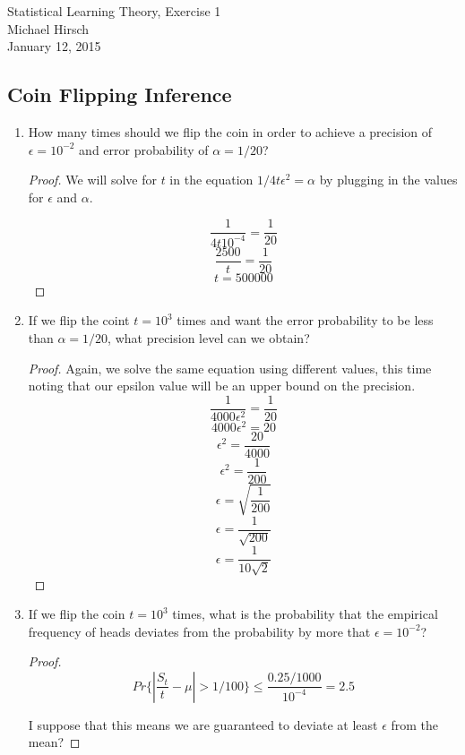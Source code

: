 \documentclass[]{book}
\theoremstyle{definition}
\begin{document}
\begin{center}
{\Large Statistical Learning Theory, Exercise 1}\\
Michael Hirsch\\ %
January 12, 2015 %
\end{center}

\vspace{0.2 cm}


\subsection*{Coin Flipping Inference}

\begin{enumerate}
\item\label{norms}
How many times should we flip the coin in order to achieve a precision of $\epsilon = 10^{-2}$ and error probability of $\alpha = 1/20$?
\begin{proof}
	We will solve for $t$ in the equation $1/4t\epsilon^{2} = \alpha$ by plugging in the values for $\epsilon$ and $\alpha$.

	$$ \dfrac{1}{4t10^{-4}} = \dfrac{1}{20}$$
	$$ \dfrac{2500}{t} = \dfrac{1}{20}$$
	$$ t = 500000$$
\end{proof}

\item	If we flip the coint $ t = 10^{3}$ times and want the error probability to be less than $\alpha = 1/20$, what precision level can we obtain?
\begin{proof} Again, we solve the same equation using different values, this time noting that our epsilon value will be an upper bound on the precision.
	$$ \dfrac{1}{4000\epsilon^{2}} = \dfrac{1}{20}$$
	$$ 4000\epsilon^{2} = 20 $$
	$$ \epsilon ^{2} = \dfrac{20}{4000}$$
	$$ \epsilon ^{2} = \dfrac{1}{200}$$
	$$ \epsilon  = \sqrt{\dfrac{1}{200}}$$
	$$ \epsilon  = \dfrac{1}{\sqrt{200}}$$
	$$ \epsilon  = \dfrac{1}{10\sqrt{2}}$$
\end{proof}

\item	If we flip the coin $t = 10^{3}$ times, what is the probability that the empirical frequency of heads deviates from the probability by more that $\epsilon = 10 ^ {-2}$?
\begin{proof}
		$$ Pr\{| \dfrac{S_{t}}{t} - \mu | > 1/100 \} \leq \dfrac{0.25/1000}{10^{-4}} = 2.5$$
		
I suppose that this means we are guaranteed to deviate at least $\epsilon$ from the mean?
\end{proof}


\end{enumerate}
\end{document}
